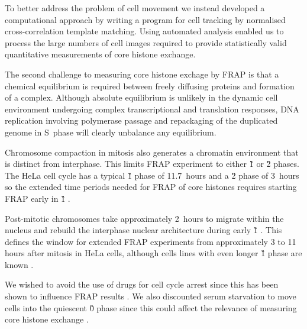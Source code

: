     To better address the problem of cell movement we
    instead developed a computational approach
    by writing a program for cell tracking by normalised
    cross-correlation template matching.
    Using automated analysis enabled us to process
    the large numbers of cell images
    required to provide statistically valid
    quantitative measurements of core histone exchange.


    The second challenge to measuring core histone exchage by FRAP is that
    a chemical equilibrium is required between freely diffusing proteins and
    formation of a complex. Although absolute equilibrium is unlikely
    in the dynamic cell environment undergoing
    complex transcriptional and translation responses,
    DNA replication involving polymerase passage
    and repackaging of the duplicated genome
    in S~phase will clearly unbalance any equilibrium.

    Chromosome compaction in mitosis also generates a chromatin environment
    that is distinct from interphase.
    This limits FRAP experiment to either \G1{} or \G2{} phases.
    The HeLa cell cycle has a typical \G1{} phase of 11.7~hours
    and a \G2{} phase of 3~hours \citep{HeLaCellCycle}
    so the extended time periods needed for FRAP of core histones requires
    starting FRAP early in \G1{} .

    Post-mitotic chromosomes take approximately 2~hours
    to migrate within the nucleus
    and rebuild the interphase nuclear architecture during early \G1{}
    \citep{visualizationG1chromosomes,earlyg1position,RelativeChromosomePosition}.
    This defines the window for extended FRAP experiments
    from approximately 3 to 11 hours after mitosis
    in HeLa cells, although cells lines with even longer
    \G1{} phase are known \citep{PancreaticCells}.

    We wished to avoid the use of drugs for cell
    cycle arrest since this has been
    shown to influence FRAP results \citep{KimuraCook}.
    We also discounted serum starvation to move cells into the
    quiescent \G0{} phase since this could affect
    the relevance of measuring core histone
    exchange \citep{SerumStarvation}.

